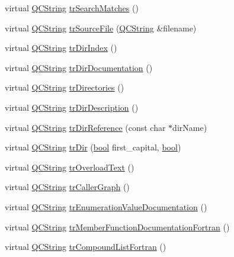 \begin{DoxyCompactItemize}
virtual \hyperlink{class_q_c_string}{Q\+C\+String} \hyperlink{class_translator_indonesian_af595203553ea2b4ad1fa441e693d5bba}{tr\+Search\+Matches} ()
\item 
virtual \hyperlink{class_q_c_string}{Q\+C\+String} \hyperlink{class_translator_indonesian_a6369756ab29fc9c434408787414f628d}{tr\+Source\+File} (\hyperlink{class_q_c_string}{Q\+C\+String} \&filename)
\item 
virtual \hyperlink{class_q_c_string}{Q\+C\+String} \hyperlink{class_translator_indonesian_a8159914635e87d6c5dda4c1ed48095c5}{tr\+Dir\+Index} ()
\item 
virtual \hyperlink{class_q_c_string}{Q\+C\+String} \hyperlink{class_translator_indonesian_a0ad6dfb602e4a87ff07eec996efd1ef0}{tr\+Dir\+Documentation} ()
\item 
virtual \hyperlink{class_q_c_string}{Q\+C\+String} \hyperlink{class_translator_indonesian_ad02ff0b4defce647958f347763fab20d}{tr\+Directories} ()
\item 
virtual \hyperlink{class_q_c_string}{Q\+C\+String} \hyperlink{class_translator_indonesian_a40c06db925621c70c01a85305333bbff}{tr\+Dir\+Description} ()
\item 
virtual \hyperlink{class_q_c_string}{Q\+C\+String} \hyperlink{class_translator_indonesian_a416032adff144a9abdd5945feaee488f}{tr\+Dir\+Reference} (const char $\ast$dir\+Name)
\item 
virtual \hyperlink{class_q_c_string}{Q\+C\+String} \hyperlink{class_translator_indonesian_acabd31f296daa0346282ce7e3128cc41}{tr\+Dir} (\hyperlink{qglobal_8h_a1062901a7428fdd9c7f180f5e01ea056}{bool} first\+\_\+capital, \hyperlink{qglobal_8h_a1062901a7428fdd9c7f180f5e01ea056}{bool})
\item 
virtual \hyperlink{class_q_c_string}{Q\+C\+String} \hyperlink{class_translator_indonesian_a8ac8bb07a59c063c22fcffa4c04db017}{tr\+Overload\+Text} ()
\item 
virtual \hyperlink{class_q_c_string}{Q\+C\+String} \hyperlink{class_translator_indonesian_a4b47ece1d7a23c18d7cc1fd9d44d07b5}{tr\+Caller\+Graph} ()
\item 
virtual \hyperlink{class_q_c_string}{Q\+C\+String} \hyperlink{class_translator_indonesian_af1e251ffec041e91a4aae107ded06676}{tr\+Enumeration\+Value\+Documentation} ()
\item 
virtual \hyperlink{class_q_c_string}{Q\+C\+String} \hyperlink{class_translator_indonesian_a73d636f40870477629500c60d740a214}{tr\+Member\+Function\+Documentation\+Fortran} ()
\item 
virtual \hyperlink{class_q_c_string}{Q\+C\+String} \hyperlink{class_translator_indonesian_a4c7afa351c3e5f842da2d237e0485ee1}{tr\+Compound\+List\+Fortran} ()

\end{DoxyCompactItemize}
